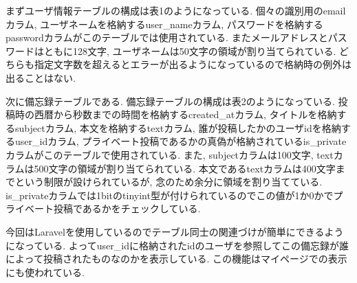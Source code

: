 \documentclass[submit,techrep]{ipsj}
\begin{document}
まずユーザ情報テーブルの構成は表1のようになっている. 個々の識別用のemailカラム, ユーザネームを格納するuser\_nameカラム, パスワードを格納するpasswordカラムがこのテーブルでは使用されている. 
またメールアドレスとパスワードはともに128文字, ユーザネームは50文字の領域が割り当てられている. どちらも指定文字数を超えるとエラーが出るようになっているので格納時の例外は出ることはない. 

\begin{table}[htb]
\centering
  \caption{ユーザ情報テーブル構成}
\end{table}

次に備忘録テーブルである. 備忘録テーブルの構成は表2のようになっている. 投稿時の西暦から秒数までの時間を格納するcreated\_atカラム, タイトルを格納するsubjectカラム, 本文を格納するtextカラム, 誰が投稿したかのユーザidを格納するuser\_idカラム, プライベート投稿であるかの真偽が格納されているis\_privateカラムがこのテーブルで使用されている. 
また, subjectカラムは100文字, textカラムは500文字の領域が割り当てられている. 本文であるtextカラムは400文字までという制限が設けられているが, 念のため余分に領域を割り当てている. 
is\_privateカラムでは1bitのtinyint型が付けられているのでこの値が1か0かでプライベート投稿であるかをチェックしている. 

今回はLaravelを使用しているのでテーブル同士の関連づけが簡単にできるようになっている. よってuser\_idに格納されたidのユーザを参照してこの備忘録が誰によって投稿されたものなのかを表示している. この機能はマイページでの表示にも使われている. 

\begin{table}[htb]
\centering
  \caption{備忘録テーブル構成}
\end{table}
\end{document}
